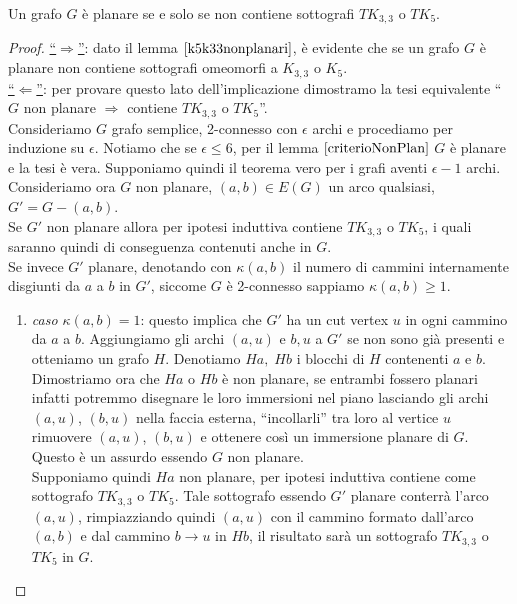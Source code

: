 \begin{teorema}
    Un grafo \(G\) è planare se e solo se non contiene sottografi \(TK_{3,3}\) o \(TK_5\).
    \begin{proof}
        \underline{“\(\Rightarrow\)”}: dato il lemma \(\ref{k5k33nonplanari}\), è evidente che se un grafo \(G\) è planare non contiene sottografi omeomorfi a \(K_{3,3}\) o \(K_5\). \smallskip \\
        \underline{“\(\Leftarrow\)”}: per provare questo lato dell'implicazione dimostramo la tesi equivalente “\(G\) non planare \(\Rightarrow\) contiene \(TK_{3,3}\) o \(TK_5\)”.\\
        Consideriamo \(G\) grafo semplice, 2-connesso con \(\epsilon\) archi e procediamo per induzione su \(\epsilon\). Notiamo che se \(\epsilon \leq 6\), per il lemma \(\ref{criterioNonPlan}\) \(G\) è planare e la tesi è vera. Supponiamo quindi il teorema vero per i grafi aventi \(\epsilon-1\) archi.\\
        Consideriamo ora \(G\) non planare, \((a,b) \in E(G)\) un arco qualsiasi, \(G'=G-(a,b)\). \\
        Se \(G'\) non planare allora per ipotesi induttiva contiene \(TK_{3,3}\) o \(TK_5\), i quali saranno quindi di conseguenza contenuti anche in \(G\). \\
        Se invece \(G'\) planare, denotando con \(\kappa(a,b)\) il numero di cammini internamente disgiunti da \(a\) a \(b\) in \(G'\), siccome \(G\) è 2-connesso sappiamo \(\kappa(a,b)\geq 1\).
        \begin{enumerate}
            \item \textit{caso \(\kappa(a,b)=1\)}: questo implica che \(G'\) ha un cut vertex \(u\) in ogni cammino da \(a\) a \(b\). Aggiungiamo gli archi \((a,u)\) e \(b,u\) a \(G'\) se non sono già presenti e otteniamo un grafo \(H\). Denotiamo \(Ha,\; Hb\) i blocchi di \(H\) contenenti \(a\) e \(b\).
            \\ Dimostriamo ora che \(Ha\) o \(Hb\) è non planare, se entrambi fossero planari infatti potremmo disegnare le loro immersioni nel piano lasciando gli archi \((a,u)\), \((b,u)\) nella faccia esterna, “incollarli” tra loro al vertice \(u\) rimuovere  \((a,u)\), \((b,u)\) e ottenere così un immersione planare di \(G\). Questo è un assurdo essendo \(G\) non planare.\\
            Supponiamo quindi \(Ha\) non planare, per ipotesi induttiva contiene come sottografo \(TK_{3,3}\) o \(TK_5\). Tale sottografo essendo \(G'\) planare conterrà l'arco \((a,u)\), rimpiazziando quindi \((a,u)\) con il cammino formato dall'arco \((a,b)\) e dal cammino \(b \to u\) in \(Hb\), il risultato sarà un sottografo \(TK_{3,3}\) o \(TK_5\) in \(G\).

\end{enumerate}
\end{proof}
\end{teorema}
